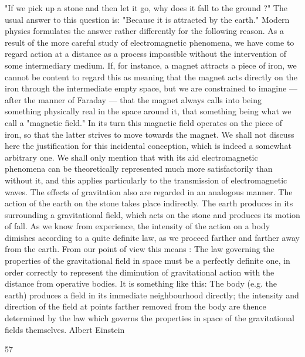 \documentclass{article}
\begin{document}
"If we pick up a stone and then let it go, why does it fall to the ground ?" The usual
answer to this question is: "Because it is attracted by the earth." Modern physics formulates
the answer rather differently for the following reason. As a result of the more careful study
of electromagnetic phenomena, we have come to regard action at a distance as a process
impossible without the intervention of some intermediary medium. If, for instance, a
magnet attracts a piece of iron, we cannot be content to regard this as meaning that the
magnet acts directly on the iron through the intermediate empty space, but we are
constrained to imagine — after the manner of Faraday — that the magnet always calls into
being something physically real in the space around it, that something being what we call a
"magnetic field." In its turn this magnetic field operates on the piece of iron, so that the
latter strives to move towards the magnet. We shall not discuss here the justification for this
incidental conception, which is indeed a somewhat arbitrary one. We shall only mention
that with its aid electromagnetic phenomena can be theoretically represented much more
satisfactorily than without it, and this applies particularly to the transmission of
electromagnetic waves. The effects of gravitation also are regarded in an analogous manner.
The action of the earth on the stone takes place indirectly. The earth produces in its
surrounding a gravitational field, which acts on the stone and produces its motion of fall. As
we know from experience, the intensity of the action on a body dimishes according to a
quite definite law, as we proceed farther and farther away from the earth. From our point of
view this means : The law governing the properties of the gravitational field in space must
be a perfectly definite one, in order correctly to represent the diminution of gravitational
action with the distance from operative bodies. It is something like this: The body (e.g. the
earth) produces a field in its immediate neighbourhood directly; the intensity and direction
of the field at points farther removed from the body are thence determined by the law which
governs the properties in space of the gravitational fields themselves.
Albert Einstein

57
\end{document}
